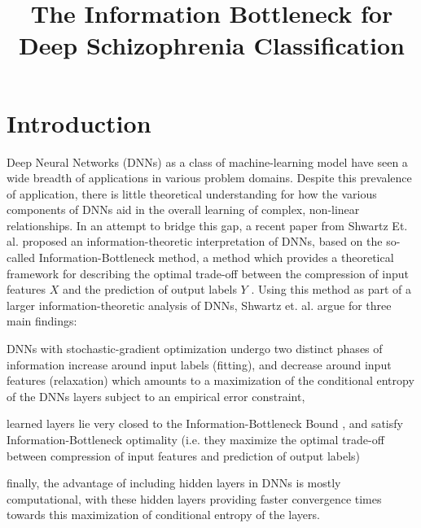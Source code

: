 \documentclass[conference, 5pt]{IEEEtran}
\begin{document}
\title{The Information Bottleneck for Deep Schizophrenia Classification}
\renewcommand{\todo}[1]{\color{red}{#1}\color{black}}
\author{
\and
{}
}

\maketitle


\IEEEpeerreviewmaketitle

\section{Introduction}

Deep Neural Networks (DNNs) as a class of machine-learning model have seen a wide breadth of applications in various problem domains. Despite this prevalence of application, there is little theoretical understanding for how the various components of DNNs aid in the overall learning of complex, non-linear relationships. In an attempt to bridge this gap, a recent paper from Shwartz Et. al. proposed an information-theoretic interpretation of DNNs, based on the so-called Information-Bottleneck \cite{shwartz2017opening} method, a method which provides a theoretical framework for describing the optimal trade-off between the compression of input features $X$ and the prediction of output labels $Y$ \cite{tishby2000information}. Using this method as part of a larger information-theoretic analysis of DNNs, Shwartz et. al. argue for three main findings: 
\begin{enumerate*}
\item DNNs with stochastic-gradient optimization undergo two distinct phases of information increase around input labels (fitting), and decrease around input features (relaxation) which amounts to a maximization of the conditional entropy of the DNNs layers subject to an empirical error constraint,
\item  learned layers lie very closed to the Information-Bottleneck Bound \cite{tishby2000information}, and satisfy Information-Bottleneck optimality (i.e. they maximize the optimal trade-off between compression of input features and prediction of output labels)
\item finally, the advantage of including hidden layers in DNNs is mostly computational, with these hidden layers providing faster convergence times towards this maximization of conditional entropy of the layers.
\end{enumerate*}\cite{shwartz2017opening}
\end{document}
